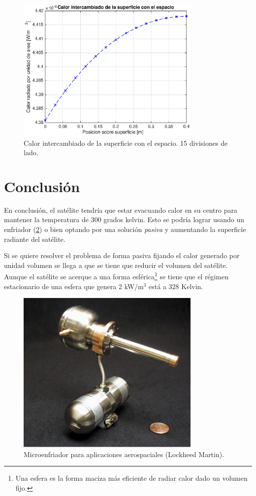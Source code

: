 \documentclass[onecolumn,10pt,titlepage,a4paper]{article}
\begin{document}
\begin{figure}[htb!]
	\centering
	\includegraphics[width=0.8\textwidth]{fig/calorint15.eps}
	\caption{Calor intercambiado de la superficie con el espacio. 15 divisiones de lado.}
	\label{fig:calor}
\end{figure}

\section*{Conclusión}
En conclusión, el satélite tendría que estar evacuando calor en su centro para mantener la temperatura de 300 grados kelvin. Esto se podría lograr usando un enfriador (\ref{fig:cryocooler}) o bien optando por una solución \textit{pasiva} y aumentando la superficie radiante del satélite. 

Si se quiere resolver el problema de forma pasiva fijando el calor generado por unidad volumen se llega a que se tiene que reducir el volumen del satélite. Aunque el satélite se acerque a una forma esférica\footnote{Una esfera es la forma maciza más eficiente de radiar calor dado un volumen fijo.} se tiene que el régimen estacionario de una esfera que genera 2 kW/m$^3$ está a 328 Kelvin. 

\begin{figure}[htb!]
	\centering
	\includegraphics[width=0.8\textwidth]{fig/cryocooler.png}
	\caption{Microenfriador para aplicaciones aerospaciales (Lockheed Martin). }
	\label{fig:cryocooler}
\end{figure}


% 
\end{document}
